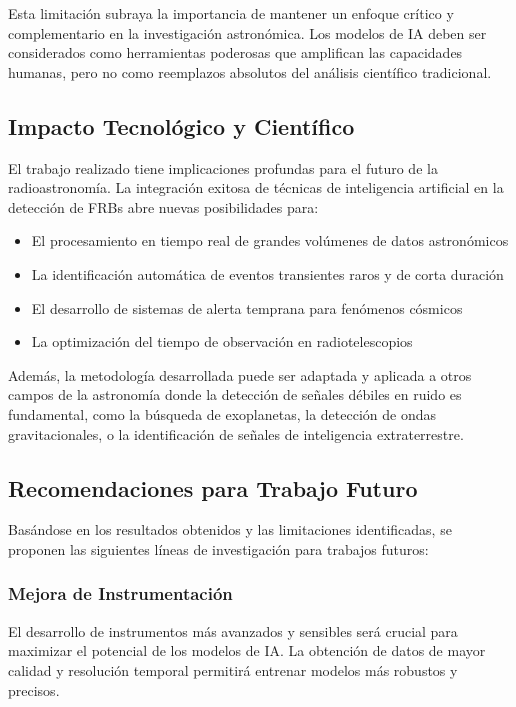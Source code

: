 Esta limitación subraya la importancia de mantener un enfoque crítico y complementario en la investigación astronómica. Los modelos de IA deben ser considerados como herramientas poderosas que amplifican las capacidades humanas, pero no como reemplazos absolutos del análisis científico tradicional.

\subsection{Impacto Tecnológico y Científico}

El trabajo realizado tiene implicaciones profundas para el futuro de la radioastronomía. La integración exitosa de técnicas de inteligencia artificial en la detección de FRBs abre nuevas posibilidades para:

\begin{itemize}
    \item El procesamiento en tiempo real de grandes volúmenes de datos astronómicos
    \item La identificación automática de eventos transientes raros y de corta duración
    \item El desarrollo de sistemas de alerta temprana para fenómenos cósmicos
    \item La optimización del tiempo de observación en radiotelescopios
\end{itemize}

Además, la metodología desarrollada puede ser adaptada y aplicada a otros campos de la astronomía donde la detección de señales débiles en ruido es fundamental, como la búsqueda de exoplanetas, la detección de ondas gravitacionales, o la identificación de señales de inteligencia extraterrestre.

\subsection{Recomendaciones para Trabajo Futuro}

Basándose en los resultados obtenidos y las limitaciones identificadas, se proponen las siguientes líneas de investigación para trabajos futuros:

\subsubsection{Mejora de Instrumentación}

El desarrollo de instrumentos más avanzados y sensibles será crucial para maximizar el potencial de los modelos de IA. La obtención de datos de mayor calidad y resolución temporal permitirá entrenar modelos más robustos y precisos.

